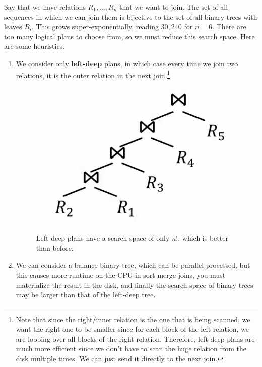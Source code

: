 \documentclass{article}
\begin{document}
    Say that we have relations $R_1, \ldots, R_n$ that we want to join. The set of all sequences in which we can join them is bijective to the set of all binary trees with leaves $R_i$. This grows super-exponentially, reading $30,240$ for $n = 6$. There are too many logical plans to choose from, so we must reduce this search space. Here are some heuristics. 
    \begin{enumerate}
      \item We consider only \textbf{left-deep} plans, in which case every time we join two relations, it is the outer relation in the next join.\footnote{Note that since the right/inner relation is the one that is being scanned, we want the right one to be smaller since for each block of the left relation, we are looping over all blocks of the right relation. Therefore, left-deep plans are much more efficient since we don't have to scan the huge relation from the disk multiple times. We can just send it directly to the next join.} 

      \begin{figure}[H]
        \centering 
        \includegraphics[scale=0.4]{img/left_deep.png}
        \caption{Left deep plans have a search space of only $n!$, which is better than before. } 
        \label{fig:left_deep}
      \end{figure} 

      \item We can consider a balance binary tree, which can be parallel processed, but this causes more runtime on the CPU in sort-merge joins, you must materialize the result in the disk, and finally the search space of binary trees may be larger than that of the left-deep tree. 
    \end{enumerate}
\end{document}
